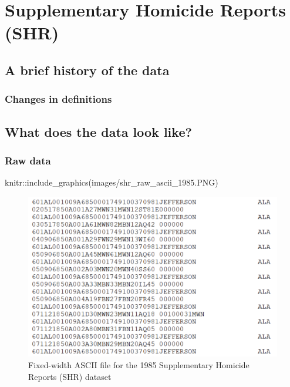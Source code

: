 \documentclass[
  12pt,
  openany]{book}
\newenvironment{Shaded}{\begin{snugshade}}{\end{snugshade}}
\newcommand{\FunctionTok}[1]{\textcolor[rgb]{0,0,0}{#1}}
\newcommand{\NormalTok}[1]{#1}
\newcommand{\SpecialCharTok}[1]{\textcolor[rgb]{0,0,0}{#1}}
\newcommand{\StringTok}[1]{\textcolor[rgb]{0.5,0.5,0.5}{#1}}
\begin{document}
\hypertarget{shr}{%
\chapter{Supplementary Homicide Reports (SHR)}\label{shr}}

\hypertarget{a-brief-history-of-the-data-3}{%
\section{A brief history of the data}\label{a-brief-history-of-the-data-3}}

\hypertarget{changes-in-definitions-3}{%
\subsection{Changes in definitions}\label{changes-in-definitions-3}}

\hypertarget{what-does-the-data-look-like-3}{%
\section{What does the data look like?}\label{what-does-the-data-look-like-3}}

\hypertarget{raw-data-3}{%
\subsection{Raw data}\label{raw-data-3}}

\begin{Shaded}
\begin{Highlighting}[]
\NormalTok{knitr}\SpecialCharTok{::}\FunctionTok{include\_graphics}\NormalTok{(}\StringTok{\textquotesingle{}images/shr\_raw\_ascii\_1985.PNG\textquotesingle{}}\NormalTok{)}
\end{Highlighting}
\end{Shaded}

\begin{figure}
\includegraphics[width=7.39in]{images/shr_raw_ascii_1985} \caption{Fixed-width ASCII file for the 1985 Supplementary Homicide Reports (SHR) dataset}\label{fig:unnamed-chunk-1}
\end{figure}
\end{document}
